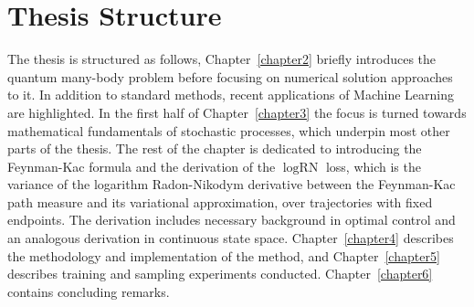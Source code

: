 \section{Thesis Structure}
\label{sec:structure}
The thesis is structured as follows, Chapter~\ref{chapter2} briefly introduces the quantum many-body problem before focusing on numerical solution approaches to it. In addition to standard methods, recent applications of Machine Learning are highlighted. In the first half of Chapter~\ref{chapter3} the focus is turned towards mathematical fundamentals of stochastic processes, which underpin most other parts of the thesis. The rest of the chapter is dedicated to introducing the Feynman-Kac formula and the derivation of the $\log \text{RN}$ loss, which is the variance of the logarithm Radon-Nikodym derivative between the Feynman-Kac path measure and its variational approximation, over trajectories with fixed endpoints. The derivation includes necessary background in optimal control and an analogous derivation in continuous state space. Chapter~\ref{chapter4} describes the methodology and implementation of the method, and Chapter~\ref{chapter5} describes training and sampling experiments conducted. Chapter~\ref{chapter6} contains concluding remarks.







